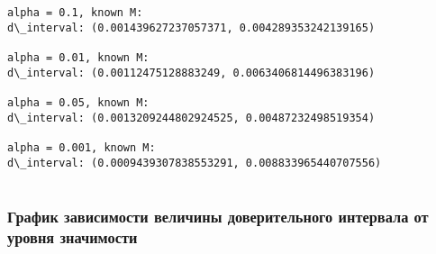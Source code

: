 \documentclass[11pt]{article}
\begin{document}
    \begin{Verbatim}[commandchars=\\\{\}]
alpha = 0.1, known M:
d\_interval: (0.001439627237057371, 0.004289353242139165)

alpha = 0.01, known M:
d\_interval: (0.00112475128883249, 0.0063406814496383196)

alpha = 0.05, known M:
d\_interval: (0.0013209244802924525, 0.00487232498519354)

alpha = 0.001, known M:
d\_interval: (0.0009439307838553291, 0.008833965440707556)


    \end{Verbatim}

    \subsubsection{График зависимости величины доверительного интервала от
уровня
значимости}\label{ux433ux440ux430ux444ux438ux43a-ux437ux430ux432ux438ux441ux438ux43cux43eux441ux442ux438-ux432ux435ux43bux438ux447ux438ux43dux44b-ux434ux43eux432ux435ux440ux438ux442ux435ux43bux44cux43dux43eux433ux43e-ux438ux43dux442ux435ux440ux432ux430ux43bux430-ux43eux442-ux443ux440ux43eux432ux43dux44f-ux437ux43dux430ux447ux438ux43cux43eux441ux442ux438}
\end{document}
